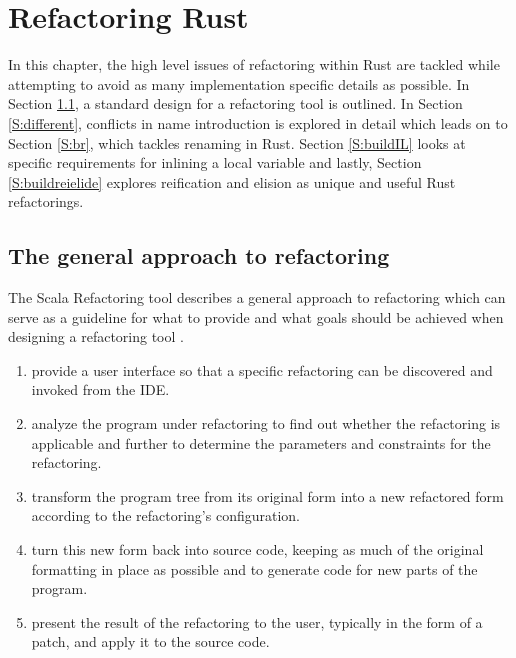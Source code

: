 \chapter{Refactoring Rust}\label{C:wd}
In this chapter, the high level issues of refactoring within Rust are tackled while attempting to avoid as many implementation specific details as possible. In Section \ref{S:generalapproach}, a standard design for a refactoring tool is outlined. In Section \ref{S:different}, conflicts in name introduction is explored in detail which leads on to Section \ref{S:br}, which tackles renaming in Rust. Section \ref{S:buildIL} looks at specific requirements for inlining a local variable and lastly, Section \ref{S:buildreielide} explores reification and elision as unique and useful Rust refactorings.

\section{The general approach to refactoring}\label{S:generalapproach}
The Scala Refactoring tool describes a general approach to refactoring which can serve as a guideline for what to provide and what goals should be achieved when designing a refactoring tool \cite{stocker2010scala}.
\begin{enumerate}
\item provide a user interface so that a specific refactoring can be discovered and invoked from the IDE.
\item analyze the program under refactoring to find out whether the refactoring is applicable and further to determine the parameters and constraints for the refactoring.
\item transform the program tree from its original form into a new refactored form according to the refactoring’s configuration.
\item turn this new form back into source code, keeping as much of the original formatting in place as possible and to generate code for new parts of the program.
\item present the result of the refactoring to the user, typically in the form of a patch, and apply it to the source code.
\end{enumerate}

